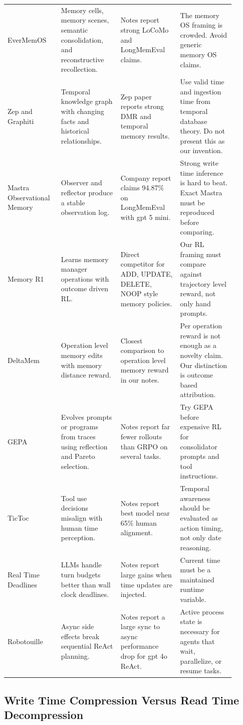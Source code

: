 \documentclass[11pt]{article}
\begin{document}
\begin{longtable}{p{0.20\linewidth} p{0.24\linewidth} p{0.24\linewidth} p{0.22\linewidth}}
EverMemOS & Memory cells, memory scenes, semantic consolidation, and reconstructive recollection. & Notes report strong LoCoMo and LongMemEval claims. & The memory OS framing is crowded. Avoid generic memory OS claims. \\
Zep and Graphiti & Temporal knowledge graph with changing facts and historical relationships. & Zep paper reports strong DMR and temporal memory results. & Use valid time and ingestion time from temporal database theory. Do not present this as our invention. \\
Mastra Observational Memory & Observer and reflector produce a stable observation log. & Company report claims 94.87\% on LongMemEval with gpt 5 mini. & Strong write time inference is hard to beat. Exact Mastra must be reproduced before comparing. \\
Memory R1 & Learns memory manager operations with outcome driven RL. & Direct competitor for ADD, UPDATE, DELETE, NOOP style memory policies. & Our RL framing must compare against trajectory level reward, not only hand prompts. \\
DeltaMem & Operation level memory edits with memory distance reward. & Closest comparison to operation level memory reward in our notes. & Per operation reward is not enough as a novelty claim. Our distinction is outcome based attribution. \\
GEPA & Evolves prompts or programs from traces using reflection and Pareto selection. & Notes report far fewer rollouts than GRPO on several tasks. & Try GEPA before expensive RL for consolidator prompts and tool instructions. \\
TicToc & Tool use decisions misalign with human time perception. & Notes report best model near 65\% human alignment. & Temporal awareness should be evaluated as action timing, not only date reasoning. \\
Real Time Deadlines & LLMs handle turn budgets better than wall clock deadlines. & Notes report large gains when time updates are injected. & Current time must be a maintained runtime variable. \\
Robotouille & Async side effects break sequential ReAct planning. & Notes report a large sync to async performance drop for gpt 4o ReAct. & Active process state is necessary for agents that wait, parallelize, or resume tasks. \\
\bottomrule
\end{longtable}

\subsection{Write Time Compression Versus Read Time Decompression}
\end{document}
